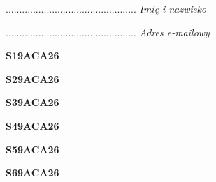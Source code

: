 \begin{turn}{90}\begin{minipage}{\linewidth} \vspace{20mm} ................................................  \textit{Imię i nazwisko}\end{minipage}\end{turn}

\begin{turn}{90}\begin{minipage}{\linewidth} \vspace{20mm} ................................................  \textit{Adres e-mailowy}\end{minipage}\end{turn}

\begin{turn}{90}\huge \begin{minipage}{\linewidth} \vspace{10mm}\textbf{S19ACA26}\end{minipage}\end{turn}

\begin{turn}{90}\huge \begin{minipage}{\linewidth} \vspace{10mm}\textbf{S29ACA26}\end{minipage}\end{turn}

\begin{turn}{90}\huge \begin{minipage}{\linewidth} \vspace{10mm}\textbf{S39ACA26}\end{minipage}\end{turn}

\begin{turn}{90}\huge \begin{minipage}{\linewidth} \vspace{10mm}\textbf{S49ACA26}\end{minipage}\end{turn}

\begin{turn}{90}\huge \begin{minipage}{\linewidth} \vspace{10mm}\textbf{S59ACA26}\end{minipage}\end{turn}

\begin{turn}{90}\huge \begin{minipage}{\linewidth} \vspace{10mm}\textbf{S69ACA26}\end{minipage}\end{turn}

